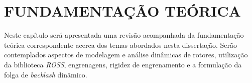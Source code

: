 
\chapter{\normalsize{FUNDAMENTAÇÃO TEÓRICA}} \label{cap:fundamentação_teorica}

\thispagestyle{empty}

Neste capítulo será apresentada uma revisão acompanhada da  fundamentação teórica correspondente acerca dos temas abordados nesta dissertação. Serão contemplados aspectos de modelagem e análise dinâmicas de rotores, utilização da biblioteca \textit{ROSS}, engrenagens, rigidez de engrenamento e a formulação da folga de \textit{backlash} dinâmico.










